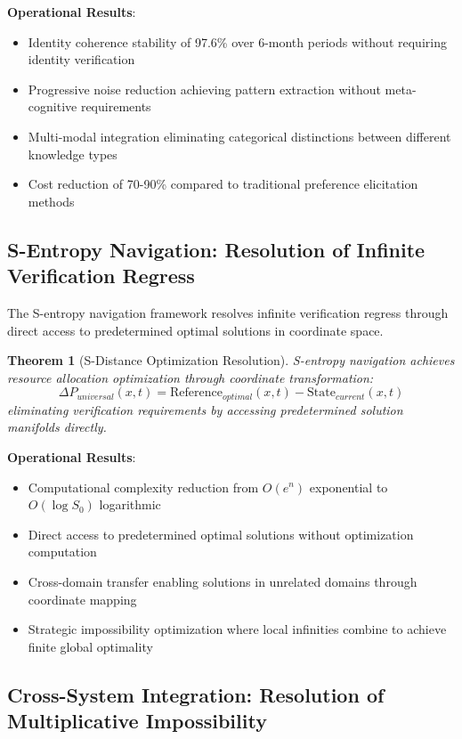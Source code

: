 \documentclass[12pt,a4paper]{article}
\newtheorem{theorem}{Theorem}[section]
\begin{document}
\textbf{Operational Results}:
\begin{itemize}
\item Identity coherence stability of 97.6\% over 6-month periods without requiring identity verification
\item Progressive noise reduction achieving pattern extraction without meta-cognitive requirements  
\item Multi-modal integration eliminating categorical distinctions between different knowledge types
\item Cost reduction of 70-90\% compared to traditional preference elicitation methods
\end{itemize}

\subsection{S-Entropy Navigation: Resolution of Infinite Verification Regress}

The S-entropy navigation framework resolves infinite verification regress through direct access to predetermined optimal solutions in coordinate space.

\begin{theorem}[S-Distance Optimization Resolution]
S-entropy navigation achieves resource allocation optimization through coordinate transformation:
$$\Delta P_{universal}(x,t) = \text{Reference}_{optimal}(x,t) - \text{State}_{current}(x,t)$$
eliminating verification requirements by accessing predetermined solution manifolds directly.
\end{theorem}

\textbf{Operational Results}:
\begin{itemize}
\item Computational complexity reduction from $O(e^n)$ exponential to $O(\log S_0)$ logarithmic
\item Direct access to predetermined optimal solutions without optimization computation
\item Cross-domain transfer enabling solutions in unrelated domains through coordinate mapping
\item Strategic impossibility optimization where local infinities combine to achieve finite global optimality
\end{itemize}

\subsection{Cross-System Integration: Resolution of Multiplicative Impossibility}
\end{document}
